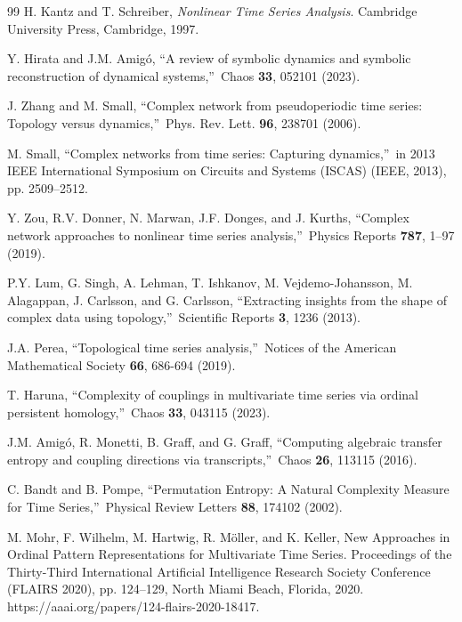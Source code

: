 \documentclass[%
 aip,
 amsmath,amssymb,
 reprint,%
]{revtex4-1}
\begin{document}
\begin{thebibliography}{99}
 H. Kantz and T. Schreiber, \textit{Nonlinear Time Series
Analysis}. Cambridge University Press, Cambridge, 1997.

 Y. Hirata and J.M. Amig\'{o}, \textquotedblleft A
review of symbolic dynamics and symbolic reconstruction of dynamical
systems,\textquotedblright\ Chaos \textbf{33}, 052101 (2023).

 J. Zhang and M. Small, \textquotedblleft Complex network
from pseudoperiodic time series: Topology versus
dynamics,\textquotedblright\ Phys. Rev. Lett. \textbf{96}, 238701 (2006).

 M. Small, \textquotedblleft Complex networks from time
series: Capturing dynamics,\textquotedblright\ in 2013 IEEE International
Symposium on Circuits and Systems (ISCAS) (IEEE, 2013), pp. 2509--2512.

 Y. Zou, R.V. Donner, N. Marwan, J.F. Donges, and J.
Kurths, \textquotedblleft Complex network approaches to nonlinear time
series analysis,\textquotedblright\ Physics Reports \textbf{787}, 1--97
(2019).

 P.Y. Lum, G. Singh, A. Lehman, T. Ishkanov, M.
Vejdemo-Johansson, M. Alagappan, J. Carlsson, and G. Carlsson,
\textquotedblleft Extracting insights from the shape of complex data using
topology,\textquotedblright\ Scientific Reports \textbf{3}, 1236 (2013).

 J.A. Perea, \textquotedblleft Topological time series
analysis,\textquotedblright\ Notices of the American Mathematical Society 
\textbf{66}, 686-694 (2019).

 T. Haruna, \textquotedblleft Complexity of couplings in
multivariate time series via ordinal persistent homology,\textquotedblright\
Chaos \textbf{33}, 043115 (2023).

 J.M. Amig\'{o}, R. Monetti, B. Graff, and G. Graff,
\textquotedblleft Computing algebraic transfer entropy and coupling
directions via transcripts,\textquotedblright\ Chaos \textbf{26}, 113115
(2016).

 C. Bandt and B. Pompe, \textquotedblleft Permutation
Entropy: A Natural Complexity Measure for Time Series,\textquotedblright\
Physical Review Letters \textbf{88}, 174102 (2002).

 M. Mohr, F. Wilhelm, M. Hartwig, R. M\"{o}ller, and K.
Keller, New Approaches in Ordinal Pattern Representations for Multivariate
Time Series. Proceedings of the Thirty-Third International Artificial
Intelligence Research Society Conference (FLAIRS 2020), pp. 124--129, North
Miami Beach, Florida, 2020.\textbf{\ }%
https://aaai.org/papers/124-flairs-2020-18417.


\end{thebibliography}
\end{document}
